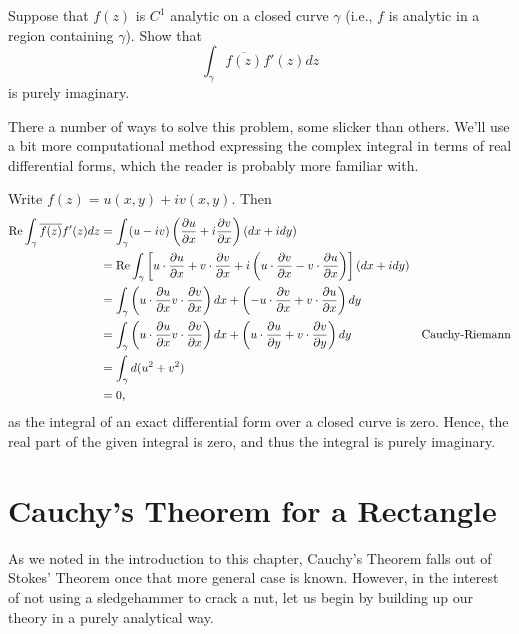 \begin{exercise}
Suppose that $f(z)$ is $C^1$ analytic on a closed curve $\gamma$ (i.e., $f$ is analytic in a region containing $\gamma$). Show that $$\int_{\gamma}\overline{f(z)}f'(z)dz$$ is purely imaginary.

\begin{sol}
    There a number of ways to solve this problem, some slicker than others. We'll use a bit more computational method expressing the complex integral in terms of real differential forms, which the reader is probably more familiar with.

    Write $f(z)=u(x,y)+iv(x,y)$. Then \begin{align*}
    \operatorname{Re} \int_{\gamma}\overline{f(z)}f'(z)dz &= \int_{\gamma}(u-iv)\left(\frac{\partial u}{\partial x}+i\dfrac{\partial v}{\partial x}\right)\left(dx+idy\right) \\
    &=\operatorname{Re} \int_{\gamma}\left[u \cdot \dfrac{\partial u}{\partial x}+v \cdot \dfrac{\partial v}{\partial x}+i\left(u \cdot \dfrac{\partial v}{\partial x}-v \cdot \dfrac{\partial u}{\partial x}\right)\right](dx+idy) \\
    &=\int_{\gamma}\left(u \cdot \dfrac{\partial u}{\partial x}v \cdot \dfrac{\partial v}{\partial x}\right)dx+\left(-u \cdot \dfrac{\partial v}{\partial x}+v \cdot \dfrac{\partial u}{\partial x}\right)dy \\
    &=\int_{\gamma} \left(u \cdot \dfrac{\partial u}{\partial x}v \cdot \dfrac{\partial v}{\partial x}\right)dx+\left(u \cdot \dfrac{\partial u}{\partial y}+v \cdot \dfrac{\partial v}{\partial y}\right)dy & \text{Cauchy-Riemann} \\
    &=\int_{\gamma}d(u^2+v^2) \\
    &=0,
    \end{align*}
    as the integral of an exact differential form over a closed curve is zero. Hence, the real part of the given integral is zero, and thus the integral is purely imaginary.
\end{sol}
\end{exercise}

\section{Cauchy's Theorem for a Rectangle}
As we noted in the introduction to this chapter, Cauchy's Theorem falls out of Stokes' Theorem once that more general case is known. However, in the interest of not using a sledgehammer to crack a nut, let us begin by building up our theory in a purely analytical way.


